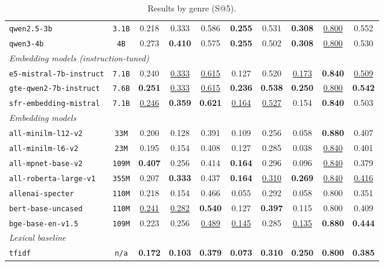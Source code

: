 \documentclass{article}
\begin{document}
\begin{table}[h!]
{\begin{tabular}{lccccccccc}
\texttt{qwen2.5-3b} & \texttt{3.1B} & 0.218 & 0.333 & 0.586 & \textbf{0.255} & 0.531 & \textbf{0.308} & \underline{0.800} & 0.552 \\
\texttt{qwen3-4b} & \texttt{4B} & 0.273 & \textbf{0.410} & 0.575 & \textbf{0.255} & 0.502 & \textbf{0.308} & \underline{0.800} & 0.530 \\
\midrule
\multicolumn{10}{l}{\textit{Embedding models (instruction-tuned)}} \\
\midrule
\texttt{e5-mistral-7b-instruct} & \texttt{7.1B} & 0.240 & \underline{0.333} & \underline{0.615} & 0.127 & 0.520 & \underline{0.173} & \textbf{0.840} & \underline{0.509} \\
\texttt{gte-qwen2-7b-instruct} & \texttt{7.6B} & \textbf{0.251} & \underline{0.333} & \underline{0.615} & \textbf{0.236} & \textbf{0.538} & \textbf{0.250} & \underline{0.800} & \textbf{0.542} \\
\texttt{sfr-embedding-mistral} & \texttt{7.1B} & \underline{0.246} & \textbf{0.359} & \textbf{0.621} & \underline{0.164} & \underline{0.527} & 0.154 & \textbf{0.840} & 0.503 \\
\midrule
\multicolumn{10}{l}{\textit{Embedding models}} \\
\midrule
\texttt{all-minilm-l12-v2} & \texttt{33M} & 0.200 & 0.128 & 0.391 & 0.109 & 0.256 & 0.058 & \textbf{0.880} & 0.407 \\
\texttt{all-minilm-l6-v2} & \texttt{23M} & 0.195 & 0.154 & 0.408 & 0.127 & 0.285 & 0.038 & \underline{0.840} & 0.401 \\
\texttt{all-mpnet-base-v2} & \texttt{109M} & \textbf{0.407} & 0.256 & 0.414 & \textbf{0.164} & 0.296 & 0.096 & \underline{0.840} & 0.379 \\
\texttt{all-roberta-large-v1} & \texttt{355M} & 0.207 & \textbf{0.333} & 0.437 & \textbf{0.164} & \underline{0.310} & \textbf{0.269} & \underline{0.840} & \underline{0.416} \\
\texttt{allenai-specter} & \texttt{110M} & 0.218 & 0.154 & 0.466 & 0.055 & 0.292 & 0.058 & 0.800 & 0.351 \\
\texttt{bert-base-uncased} & \texttt{110M} & \underline{0.241} & \underline{0.282} & \textbf{0.540} & 0.127 & \textbf{0.397} & 0.115 & 0.800 & 0.409 \\
\texttt{bge-base-en-v1.5} & \texttt{109M} & 0.223 & 0.256 & \underline{0.489} & \underline{0.145} & 0.285 & \underline{0.135} & \textbf{0.880} & \textbf{0.444} \\
\midrule
\multicolumn{10}{l}{\textit{Lexical baseline}} \\
\midrule
\texttt{tfidf} & \texttt{n/a} & \textbf{0.172} & \textbf{0.103} & \textbf{0.379} & \textbf{0.073} & \textbf{0.310} & \textbf{0.250} & \textbf{0.800} & \textbf{0.385} \\
\bottomrule
\end{tabular}
}
\caption{
Results by genre (S@5).}
\label{tab:genre-s10-top}
\end{table}
\end{document}

